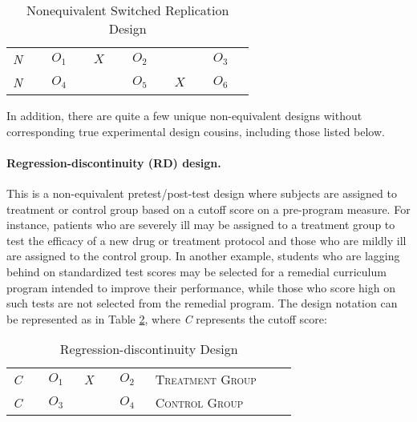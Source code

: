 \begin{table}[H]
	\centering
	\begin{tabularx}{0.75\linewidth}{p{0.10\linewidth}p{0.10\linewidth}p{0.10\linewidth}p{0.10\linewidth}p{0.10\linewidth}p{0.10\linewidth}}
		\toprule
		\textit{N} & $ O_1 $ & $ X $ & $ O_2 $ &       & $ O_3 $ \\
		\textit{N} & $ O_4 $ &       & $ O_5 $ & $ X $ & $ O_6 $ \\
		\bottomrule
	\end{tabularx}
	\caption{Nonequivalent Switched Replication Design}
	\label{09:tab09}
\end{table}

In addition, there are quite a few unique non-equivalent designs without corresponding true experimental design cousins, including those listed below.

\paragraph{Regression-discontinuity (RD) design.} This is a non-equivalent pretest/post-test design where subjects are assigned to treatment or control group based on a cutoff score on a pre-program measure. For instance, patients who are severely ill may be assigned to a treatment group to test the efficacy of a new drug or treatment protocol and those who are mildly ill are assigned to the control group. In another example, students who are lagging behind on standardized test scores may be selected for a remedial curriculum program intended to improve their performance, while those who score high on such tests are not selected from the remedial program. The design notation can be represented as in Table \ref{09:tab10}, where \textit{C} represents the cutoff score:

\begin{table}[H]
	\centering
	\begin{tabularx}{0.85\linewidth}{p{0.10\linewidth}p{0.10\linewidth}p{0.10\linewidth}p{0.10\linewidth}p{0.40\linewidth}}
		\toprule
		\textit{C} & $ O_1 $ & \textit{X} & $ O_2 $ & \textsc{Treatment Group} \\
		\textit{C} & $ O_3 $ &            & $ O_4 $ & \textsc{Control Group} \\
		\bottomrule
	\end{tabularx}
	\caption{Regression-discontinuity Design}
	\label{09:tab10}
\end{table}

